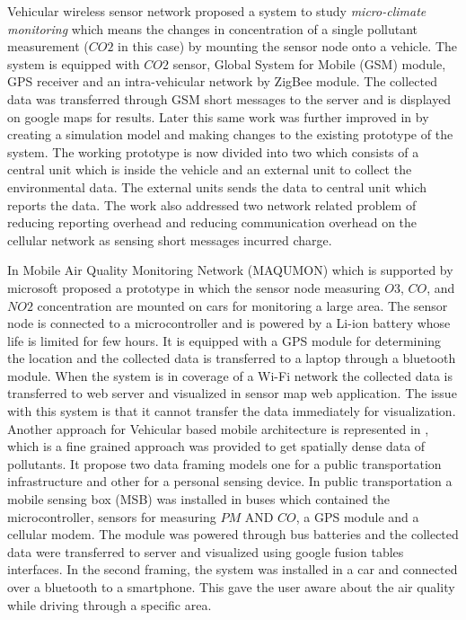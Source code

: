 Vehicular wireless sensor network \cite{Hu2009} proposed a system to study \textit{micro-climate monitoring} which means the changes in concentration of a single pollutant measurement ($CO2$ in this case) by mounting the sensor node onto a vehicle. The system is equipped with $CO2$ sensor, Global System for Mobile (GSM) module, GPS receiver and  an intra-vehicular network by ZigBee module. The collected data was transferred through GSM short messages to the server and is displayed on google maps for results. Later this same work was further improved in \cite{Hu2011} by creating a simulation model and making changes to the existing prototype of the system. The working prototype is now divided into two which consists of a central unit which is inside the vehicle and an external unit to collect the environmental data. The external units sends the data to central unit which reports the data. The work also addressed two network related problem of reducing reporting overhead and reducing communication overhead on the cellular network as sensing short messages incurred charge. 

In Mobile Air Quality Monitoring Network (MAQUMON) \cite{Volgyesi2008} which is supported by microsoft proposed a prototype in which the sensor node  measuring $O3$, $CO$, and $NO2$ concentration are mounted on cars for monitoring a large area. The sensor node is connected to a microcontroller and is powered by a Li-ion battery whose life is limited for few hours. It is equipped with a GPS module for determining the location and the collected data is transferred to a laptop through a bluetooth module. When the system is in coverage of a Wi-Fi network the collected data is transferred to web server and visualized in sensor map web application. The issue with this system is that it cannot transfer the data immediately for visualization. Another approach for Vehicular based mobile architecture is represented in \cite{Devarakonda2013}, which is a fine grained approach was provided to get spatially dense data of pollutants. It propose two data framing models one for a public transportation infrastructure and other for a personal sensing device. In public transportation a mobile sensing box (MSB) was installed in buses which contained the microcontroller, sensors for measuring $PM$ AND $ CO$, a GPS module and a cellular modem. The module was powered through bus batteries and the collected data were transferred to server and visualized using google fusion tables interfaces. In the second framing, the system was installed in a car and connected over a bluetooth to a smartphone. This gave the user aware about the air quality while driving through a specific area.

